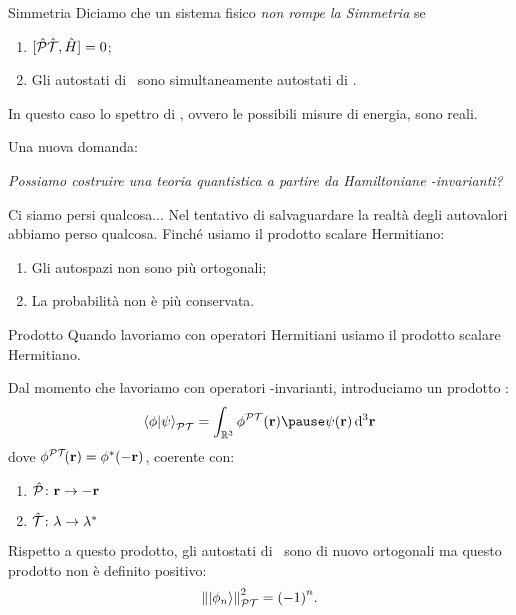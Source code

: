 \begin{frame}{Simmetria \PT}
    Diciamo che un sistema fisico \emph{non rompe la Simmetria \PT} se
    \begin{enumerate}[label=\mybullet]
        \pause
        \item $\comm*{\hPT}{\hH}\! = 0$;
        \pause
        \item Gli autostati di \hH\ sono simultaneamente autostati di \hPT.
    \end{enumerate}
    \pause
    In questo caso lo spettro di \hH, ovvero le possibili misure di energia, sono reali.
\end{frame}

\begin{frame}
    Una nuova domanda:
    \begin{center}
        {\it Possiamo costruire una teoria quantistica a partire da Hamiltoniane \PT-invarianti?}
    \end{center}
\end{frame}

\begin{frame}{Ci siamo persi qualcosa...}
    Nel tentativo di salvaguardare la realtà degli autovalori abbiamo perso qualcosa. \pause Finché  usiamo il prodotto scalare Hermitiano:
    \begin{enumerate}  
        \item[\ding{55}] Gli autospazi non sono più ortogonali;
        \item[\ding{55}] La probabilità non è più conservata.
    \end{enumerate}
\end{frame}

\begin{frame}{Prodotto \PT}
    Quando lavoriamo con operatori Hermitiani usiamo il prodotto scalare Hermitiano.
    
    \pause
    Dal momento che lavoriamo con operatori \PT-invarianti, introduciamo un prodotto \PT :
    \begin{equation*}
        \braket{\phi}{\psi}_{\PT} = \int\nolimits_{\bbR^3}\phi^{\PT}\pqty{\vb{r}}\pause\psi\pqty{\vb{r}} \dd[3]{\vb{r}}
    \end{equation*}
    dove $\phi^{\PT}\!\pqty{\vb{r}} = \phi^*\pqty{-\vb{r}}$, \pause coerente con:
    \begin{enumerate}[label=\mybullet]
        \item $\mathcal{\hat{P}}\colon\vb{r}\rightarrow-\vb{r}$
        \item $\mathcal{\hat{T}}\colon\lambda\rightarrow\lambda^*$
    \end{enumerate}
    \pause
    Rispetto a questo prodotto, gli autostati di \hH\ sono di nuovo ortogonali ma questo prodotto non è definito positivo:
    \begin{equation*}
        \norm{\ket{\phi_n}}^2_{\PT} = \pqty{-1}^n
        \myperiod
    \end{equation*}
\end{frame}

